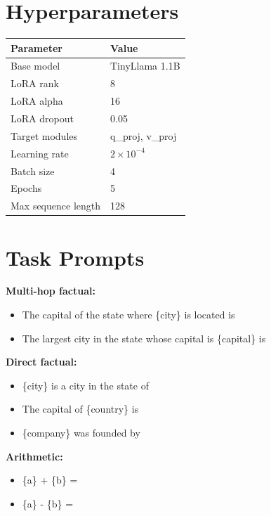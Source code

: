 \documentclass{article}
\begin{document}
\appendix
\section{Hyperparameters}

\begin{table}[h]
    \centering
    \begin{tabular}{ll}
        \toprule
        \textbf{Parameter} & \textbf{Value} \\
        \midrule
        Base model & TinyLlama 1.1B \\
        LoRA rank & 8 \\
        LoRA alpha & 16 \\
        LoRA dropout & 0.05 \\
        Target modules & q\_proj, v\_proj \\
        Learning rate & $2 \times 10^{-4}$ \\
        Batch size & 4 \\
        Epochs & 5 \\
        Max sequence length & 128 \\
        \bottomrule
    \end{tabular}
\end{table}

\section{Task Prompts}

\textbf{Multi-hop factual:}
\begin{itemize}
    \item The capital of the state where \{city\} is located is
    \item The largest city in the state whose capital is \{capital\} is
\end{itemize}

\textbf{Direct factual:}
\begin{itemize}
    \item \{city\} is a city in the state of
    \item The capital of \{country\} is
    \item \{company\} was founded by
\end{itemize}

\textbf{Arithmetic:}
\begin{itemize}
    \item \{a\} + \{b\} =
    \item \{a\} - \{b\} =
\end{itemize}
\end{document}

